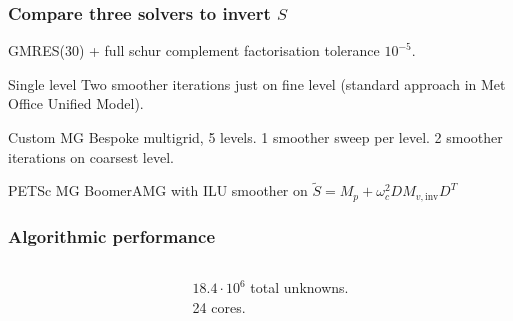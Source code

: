 \documentclass[presentation]{beamer}
\renewcommand{\vec}[1]{\ensuremath{\boldsymbol{#1}}}
\begin{document}
\begin{frame}
  \frametitle{Compare three solvers to invert $S$}
  GMRES(30) + full schur complement factorisation tolerance $10^{-5}$.

  \begin{block}{Single level}
    Two smoother iterations just on fine level (standard approach in
    Met Office Unified Model).
  \end{block}

  \begin{block}{Custom MG}
    Bespoke multigrid, 5 levels.  1 smoother sweep per level.  2 smoother
    iterations on coarsest level.
  \end{block}

  \begin{block}{PETSc MG}
    BoomerAMG with ILU smoother on $\tilde{S} = M_p + \omega_c^2 D M_{v,\text{inv}} D^T$
  \end{block}
\end{frame}
\begin{frame}
  \frametitle{Algorithmic performance}
  \begin{columns}
    \begin{column}{0.75\textwidth}
    \end{column}
    \begin{column}{0.25\textwidth}
      $18.4\cdot 10^6$ total unknowns.\\
      24 cores.
    \end{column}
  \end{columns}
\end{frame}
\end{document}
